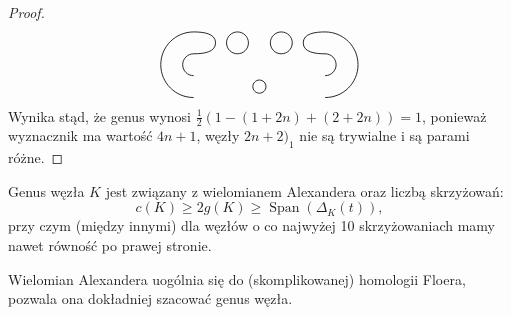 \begin{proof}
\[\begin{tikzpicture}[baseline=-0.65ex,scale=0.055]
        \draw[semithick] (0,-10) circle (3);

        \draw[semithick] (-30, 15) to [out=left, in=up]   (-45, 0);
        \draw[semithick] (-30,-15) to [out=left, in=down] (-45, 0);
        \draw[semithick] (-30,  5) to [out=left, in=up]   (-35, 0);
        \draw[semithick] (-30, -5) to [out=left, in=down] (-35, 0);

        \draw[semithick] (30, 15) to [out=right, in=up]   (45,0);
        \draw[semithick] (30,-15) to [out=right, in=down] (45,0);
        \draw[semithick] (30,  5) to [out=right, in=up]   (35,0);
        \draw[semithick] (30, -5) to [out=right, in=down] (35,0);

        \draw[semithick] (-30, 15) to [out=right, in=up] (-20,10);
        \draw[semithick] (-30,  5) to [out=right, in=down] (-20,10);

        \draw[semithick] (30, 15) to [out=left, in=up] (20,10);
        \draw[semithick] (30,  5) to [out=left, in=down] (20,10);

        \draw[semithick] (-10, 10) circle (5);
        \draw[semithick] (10,  10) circle (5);
    \end{tikzpicture}
\]
Wynika stąd, że genus wynosi $\frac 12 (1 - (1+2n) + (2+2n)) = 1$, ponieważ wyznacznik ma wartość $4n+1$,
węzły $2n+2)_1$ nie są trywialne i są parami różne.
\end{proof}

\begin{proposition}
    Genus węzła $K$ jest związany z wielomianem Alexandera oraz liczbą skrzyżowań:
    \[
        c(K) \ge 2 g(K) \ge \operatorname{Span}(\Delta_K(t)),
    \]
    przy czym (między innymi) dla węzłów o co najwyżej 10 skrzyżowaniach mamy nawet równość po prawej stronie.
\end{proposition}

Wielomian Alexandera uogólnia się do (skomplikowanej) homologii Floera, pozwala ona dokładniej szacować genus węzła.

